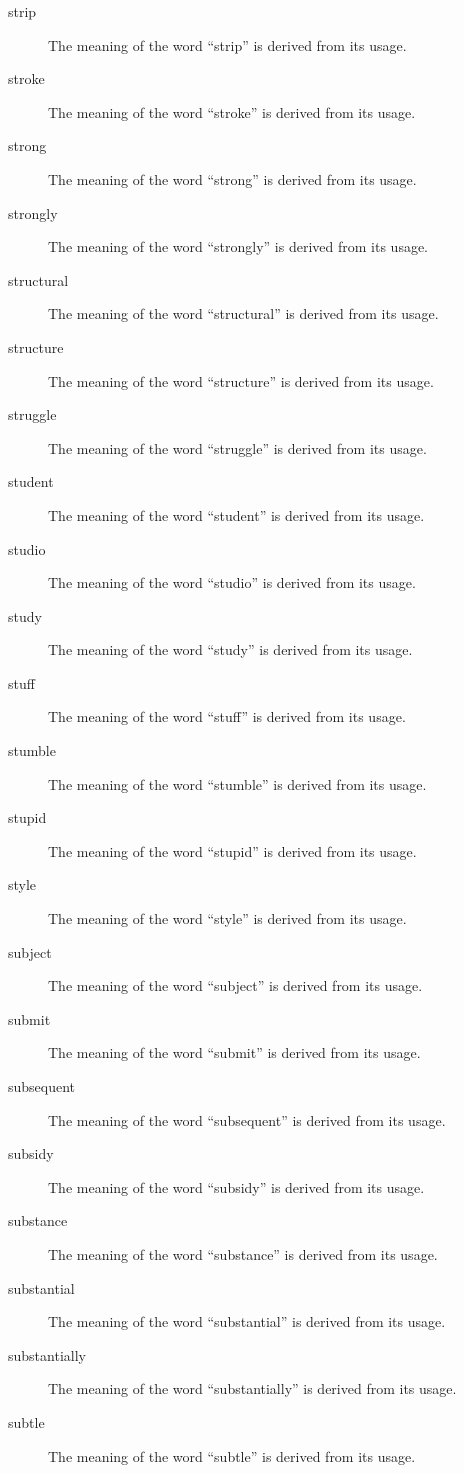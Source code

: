 \documentclass[12pt, letterpaper]{memoir}
\begin{document}
\begin{description}
\item[strip] The meaning of the word ``strip'' is derived from its usage.
\item[stroke] The meaning of the word ``stroke'' is derived from its usage.
\item[strong] The meaning of the word ``strong'' is derived from its usage.
\item[strongly] The meaning of the word ``strongly'' is derived from its usage.
\item[structural] The meaning of the word ``structural'' is derived from its usage.
\item[structure] The meaning of the word ``structure'' is derived from its usage.
\item[struggle] The meaning of the word ``struggle'' is derived from its usage.
\item[student] The meaning of the word ``student'' is derived from its usage.
\item[studio] The meaning of the word ``studio'' is derived from its usage.
\item[study] The meaning of the word ``study'' is derived from its usage.
\item[stuff] The meaning of the word ``stuff'' is derived from its usage.
\item[stumble] The meaning of the word ``stumble'' is derived from its usage.
\item[stupid] The meaning of the word ``stupid'' is derived from its usage.
\item[style] The meaning of the word ``style'' is derived from its usage.
\item[subject] The meaning of the word ``subject'' is derived from its usage.
\item[submit] The meaning of the word ``submit'' is derived from its usage.
\item[subsequent] The meaning of the word ``subsequent'' is derived from its usage.
\item[subsidy] The meaning of the word ``subsidy'' is derived from its usage.
\item[substance] The meaning of the word ``substance'' is derived from its usage.
\item[substantial] The meaning of the word ``substantial'' is derived from its usage.
\item[substantially] The meaning of the word ``substantially'' is derived from its usage.
\item[subtle] The meaning of the word ``subtle'' is derived from its usage.

\end{description}
\end{document}
